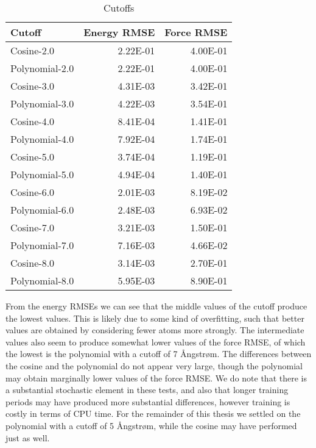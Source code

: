 \begin{table}[H]
\centering
\begin{tabular}{lrr}
\toprule
         Cutoff &  Energy RMSE &  Force RMSE \\
\midrule
     Cosine-2.0 &     2.22E-01 &    4.00E-01 \\
 Polynomial-2.0 &     2.22E-01 &    4.00E-01 \\
     Cosine-3.0 &     4.31E-03 &    3.42E-01 \\
 Polynomial-3.0 &     4.22E-03 &    3.54E-01 \\
     Cosine-4.0 &     8.41E-04 &    1.41E-01 \\
 Polynomial-4.0 &     7.92E-04 &    1.74E-01 \\
     Cosine-5.0 &     3.74E-04 &    1.19E-01 \\
 Polynomial-5.0 &     4.94E-04 &    1.40E-01 \\
     Cosine-6.0 &     2.01E-03 &    8.19E-02 \\
 Polynomial-6.0 &     2.48E-03 &    6.93E-02 \\
     Cosine-7.0 &     3.21E-03 &    1.50E-01 \\
 Polynomial-7.0 &     7.16E-03 &    4.66E-02 \\
     Cosine-8.0 &     3.14E-03 &    2.70E-01 \\
 Polynomial-8.0 &     5.95E-03 &    8.90E-01 \\
\bottomrule
\end{tabular}
\caption{Cutoffs}
\label{table:cutoffs}
\end{table}

From the energy RMSEs we can see that the middle values of the
cutoff produce the lowest values. This is likely due to some kind
of overfitting, such that better values are obtained by considering
fewer atoms more strongly. The intermediate values also
seem to produce somewhat lower values of the force RMSE,
of which the lowest is the polynomial with a cutoff of 7 Ångstrøm.
The differences between the cosine and the polynomial do not
appear very large, though the polynomial may obtain marginally
lower values of the force RMSE. We do note that there is a substantial
stochastic element in these tests, and also that longer training
periods may have produced more substantial differences, however
training is costly in terms of CPU time. For the remainder
of this thesis we settled on the polynomial with a cutoff of 5 Ångstrøm,
while the cosine may have performed just as well.

